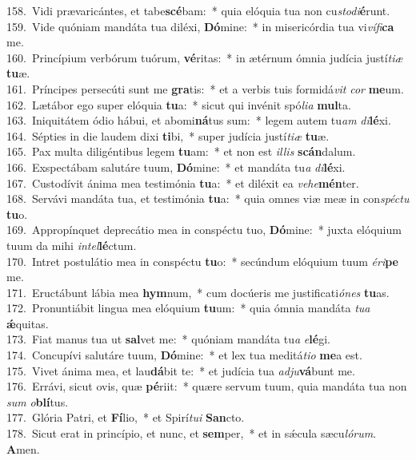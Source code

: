 {158.~}Vidi prævaricántes, et tabe\textbf{scé}bam:~* quia elóquia tua non cu\textit{sto}\textit{di}\textbf{é}runt.\\
{159.~}Vide quóniam mandáta tua diléxi, \textbf{Dó}mine:~* in misericórdia tua vi\textit{ví}\textit{fi}\textbf{ca} me.\\
{160.~}Princípium verbórum tuórum, \textbf{vé}ritas:~* in ætérnum ómnia judícia justí\textit{ti}\textit{æ} \textbf{tu}æ.\\
{161.~}Príncipes persecúti sunt me \textbf{gra}tis:~* et a verbis tuis formidá\textit{vit} \textit{cor} \textbf{me}um.\\
{162.~}Lætábor ego super elóquia \textbf{tu}a:~* sicut qui invénit spó\textit{li}\textit{a} \textbf{mul}ta.\\
{163.~}Iniquitátem ódio hábui, et abomi\textbf{ná}tus sum:~* legem autem tu\textit{am} \textit{di}\textbf{lé}xi.\\
{164.~}Sépties in die laudem dixi \textbf{ti}bi,~* super judícia justí\textit{ti}\textit{æ} \textbf{tu}æ.\\
{165.~}Pax multa diligéntibus legem \textbf{tu}am:~* et non est \textit{il}\textit{lis} \textbf{scán}dalum.\\
{166.~}Exspectábam salutáre tuum, \textbf{Dó}mine:~* et mandáta tu\textit{a} \textit{di}\textbf{lé}xi.\\
{167.~}Custodívit ánima mea testimónia \textbf{tu}a:~* et diléxit ea \textit{ve}\textit{he}\textbf{mén}ter.\\
{168.~}Servávi mandáta tua, et testimónia \textbf{tu}a:~* quia omnes viæ meæ in con\textit{spé}\textit{ctu} \textbf{tu}o.\\
{169.~}Appropínquet deprecátio mea in conspéctu tuo, \textbf{Dó}mine:~* juxta elóquium tuum da mihi \textit{in}\textit{tel}\textbf{lé}ctum.\\
{170.~}Intret postulátio mea in conspéctu \textbf{tu}o:~* secúndum elóquium tuum \textit{é}\textit{ri}\textbf{pe} me.\\
{171.~}Eructábunt lábia mea \textbf{hym}num,~* cum docúeris me justificati\textit{ó}\textit{nes} \textbf{tu}as.\\
{172.~}Pronuntiábit lingua mea elóquium \textbf{tu}um:~* quia ómnia mandáta \textit{tu}\textit{a} \textbf{ǽ}quitas.\\
{173.~}Fiat manus tua ut \textbf{sal}vet me:~* quóniam mandáta tu\textit{a} \textit{e}\textbf{lé}gi.\\
{174.~}Concupívi salutáre tuum, \textbf{Dó}mine:~* et lex tua meditá\textit{ti}\textit{o} \textbf{me}a est.\\
{175.~}Vivet ánima mea, et lau\textbf{dá}bit te:~* et judícia tua \textit{ad}\textit{ju}\textbf{vá}bunt me.\\
{176.~}Errávi, sicut ovis, quæ \textbf{pé}riit:~* quære servum tuum, quia mandáta tua non \textit{sum} \textit{o}\textbf{blí}tus.\\
{177.~}Glória Patri, et \textbf{Fí}lio,~* et Spirí\textit{tu}\textit{i} \textbf{San}cto.\\
{178.~}Sicut erat in princípio, et nunc, et \textbf{sem}per,~* et in sǽcula sæcu\textit{ló}\textit{rum}. \textbf{A}men.\\

